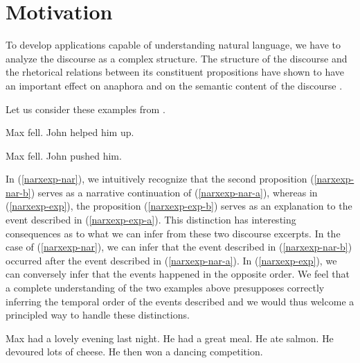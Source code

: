 \section{Motivation}

To develop applications capable of understanding natural language, we
have to analyze the discourse as a complex structure. The structure of
the discourse and the rhetorical relations between its constituent
propositions have shown to have an important effect on anaphora and on
the semantic content of the discourse \cite{asher2003logics}.

Let us consider these examples from \cite{asher2003logics}.

\begin{exe}
  \ex \label{narxexp-nar} \begin{xlist}
    \ex \label{narxexp-nar-a} Max fell.
    \ex \label{narxexp-nar-b} John helped him up.
  \end{xlist}
  \ex \label{narxexp-exp} \begin{xlist}
    \ex \label{narxexp-exp-a} Max fell.
    \ex \label{narxexp-exp-b} John pushed him.
  \end{xlist}
\end{exe}

In (\ref{narxexp-nar}), we intuitively recognize that the second
proposition (\ref{narxexp-nar-b}) serves as a narrative continuation of
(\ref{narxexp-nar-a}), whereas in (\ref{narxexp-exp}), the proposition
(\ref{narxexp-exp-b}) serves as an explanation to the event described in
(\ref{narxexp-exp-a}). This distinction has interesting consequences as
to what we can infer from these two discourse excerpts. In the case of
(\ref{narxexp-nar}), we can infer that the event described in
(\ref{narxexp-nar-b}) occurred after the event described in
(\ref{narxexp-nar-a}). In (\ref{narxexp-exp}), we can conversely infer
that the events happened in the opposite order. We feel that a complete
understanding of the two examples above presupposes correctly inferring
the temporal order of the events described and we would thus welcome a
principled way to handle these distinctions.

\begin{exe}
  \ex \label{salmon} \begin{xlist}
    \ex \label{salmon-evening} Max had a lovely evening last night.
    \ex \label{salmon-meal} He had a great meal.
    \ex \label{salmon-ate} He ate salmon.
    \ex \label{salmon-cheese} He devoured lots of cheese.
    \ex \label{salmon-competition} He then won a dancing competition.
  \end{xlist}
\end{exe}

